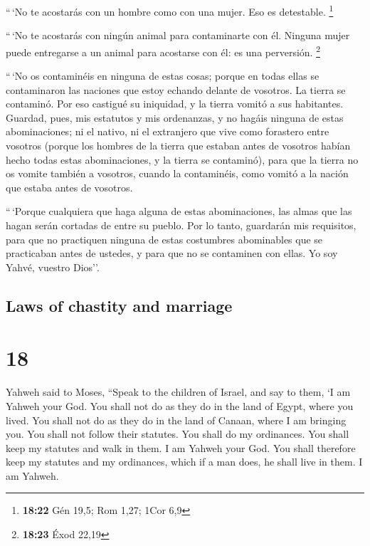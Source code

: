 \begin{paracol}{2}
 ``\,`No te acostarás con un hombre como con una mujer.
Eso es detestable. \footnote{\textbf{18:22} Gén 19,5; Rom 1,27; 1Cor 6,9}

 ``\,`No te acostarás con ningún animal para contaminarte
con él. Ninguna mujer puede entregarse a un animal para acostarse con
él: es una perversión. \footnote{\textbf{18:23} Éxod 22,19}

 ``\,`No os contaminéis en ninguna de estas cosas; porque
en todas ellas se contaminaron las naciones que estoy echando delante de
vosotros.  La tierra se contaminó. Por eso castigué su
iniquidad, y la tierra vomitó a sus habitantes.  Guardad,
pues, mis estatutos y mis ordenanzas, y no hagáis ninguna de estas
abominaciones; ni el nativo, ni el extranjero que vive como forastero
entre vosotros  (porque los hombres de la tierra que
estaban antes de vosotros habían hecho todas estas abominaciones, y la
tierra se contaminó),  para que la tierra no os vomite
también a vosotros, cuando la contaminéis, como vomitó a la nación que
estaba antes de vosotros.

 ``\,`Porque cualquiera que haga alguna de estas
abominaciones, las almas que las hagan serán cortadas de entre su
pueblo.  Por lo tanto, guardarán mis requisitos, para que
no practiquen ninguna de estas costumbres abominables que se practicaban
antes de ustedes, y para que no se contaminen con ellas. Yo soy Yahvé,
vuestro Dios''.

\switchcolumn
\begin{otherlanguage}{english}

\hypertarget{laws-of-chastity-and-marriage}{%
\subsection{Laws of chastity and
marriage}\label{laws-of-chastity-and-marriage}}

\hypertarget{section-35}{%
\section{18}\label{section-35}}

 Yahweh said to Moses,  ``Speak to the
children of Israel, and say to them, `I am Yahweh your God.
 You shall not do as they do in the land of Egypt, where
you lived. You shall not do as they do in the land of Canaan, where I am
bringing you. You shall not follow their statutes.  You
shall do my ordinances. You shall keep my statutes and walk in them. I
am Yahweh your God.  You shall therefore keep my statutes
and my ordinances, which if a man does, he shall live in them. I am
Yahweh.


\end{otherlanguage}
\end{paracol}
